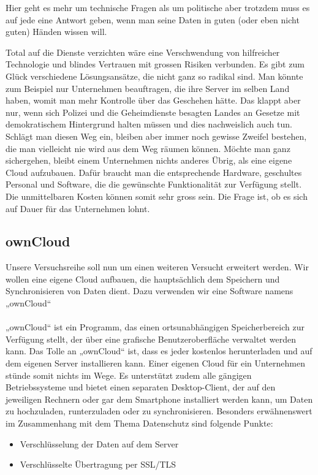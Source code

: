 Hier geht es mehr um technische Fragen als um politische aber trotzdem muss es auf jede eine Antwort geben, wenn man seine Daten in guten (oder eben nicht guten) Händen wissen will.

Total auf die Dienste verzichten wäre eine Verschwendung von hilfreicher Technologie und blindes Vertrauen mit grossen Risiken verbunden. Es gibt zum Glück verschiedene Lösungsansätze, die nicht ganz so radikal sind. Man könnte zum Beispiel nur Unternehmen beauftragen, die ihre Server im selben Land haben, womit man mehr Kontrolle über das Geschehen hätte. Das klappt aber nur, wenn sich Polizei und die Geheimdienste besagten Landes an Gesetze mit demokratischem Hintergrund halten müssen und dies nachweislich auch tun. Schlägt man diesen Weg ein, bleiben aber immer noch gewisse Zweifel bestehen, die man vielleicht nie wird aus dem Weg räumen können. Möchte man ganz sichergehen, bleibt einem Unternehmen nichts anderes Übrig, als eine eigene Cloud aufzubauen. Dafür braucht man die entsprechende Hardware, geschultes Personal und   Software, die die gewünschte Funktionalität zur Verfügung stellt. Die unmittelbaren Kosten können somit sehr gross sein. Die Frage ist, ob es sich auf Dauer für das Unternehmen lohnt.

\subsection{ownCloud}
Unsere Versuchsreihe soll nun um einen weiteren Versucht erweitert werden. Wir wollen eine eigene Cloud aufbauen, die hauptsächlich dem Speichern und Synchronisieren von Daten dient. Dazu verwenden wir eine Software namens „ownCloud“
\\
\\
„ownCloud“ ist ein Programm, das einen ortsunabhängigen Speicherbereich zur Verfügung stellt, der über eine grafische Benutzeroberfläche verwaltet werden kann. Das Tolle an „ownCloud“ ist, dass es jeder kostenlos herunterladen und auf dem eigenen Server installieren kann. Einer eigenen Cloud für ein Unternehmen stünde somit nichts im Wege. Es unterstützt zudem alle gängigen Betriebssysteme und bietet einen separaten Desktop-Client, der auf den jeweiligen Rechnern oder gar dem Smartphone installiert werden kann, um Daten zu hochzuladen, runterzuladen oder zu synchronisieren.
Besonders erwähnenswert im Zusammenhang mit dem Thema Datenschutz sind folgende Punkte:

\begin{itemize}
\item Verschlüsselung der Daten auf dem Server
\item Verschlüsselte Übertragung per SSL/TLS
\end{itemize}

